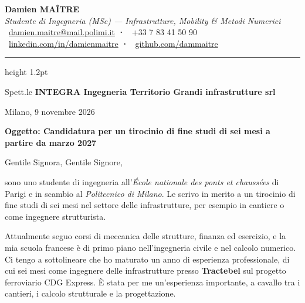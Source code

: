 \documentclass[a4paper,11pt]{extarticle}
\newcommand{\azienda}{INTEGRA Ingegneria Territorio Grandi infrastrutture srl}
\begin{document}
\begin{center}
  {\LARGE\bfseries\color{accent} Damien MAÎTRE}\\[2pt]
  {\normalsize\textit{\textcolor{muted}{Studente di Ingegneria (MSc) — Infrastrutture, Mobility \& Metodi Numerici}}}\\[4pt]
  \small
  \textcolor{muted}{
    \faEnvelope\ \href{mailto:damien.maitre@mail.polimi.it}{damien.maitre@mail.polimi.it}
    \quad\textbf{·}\quad
    \faPhone\ +33 7 83 41 50 90
    \\[1pt]
    \faLinkedin\ \href{https://linkedin.com/in/damienmaitre}{linkedin.com/in/damienmaitre}
    \quad\textbf{·}\quad
    \faGithub\ \href{https://github.com/dammaitre}{github.com/dammaitre}
  }
\end{center}

\vspace{2pt}
{\color{accent}\hrule height 1.2pt}
\vspace{10pt}

\begin{flushright}
  Spett.le \textbf{\azienda}\\
\end{flushright}

\vspace{4pt}
Milano, 9 novembre 2026

\vspace{4pt}
{\color{accent}\textbf{Oggetto: Candidatura per un tirocinio di fine studi di sei mesi a partire da marzo 2027}}

\vspace{4pt}
Gentile Signora, Gentile Signore,

sono uno studente di ingegneria all'\textit{École nationale des ponts et chaussées} di Parigi e in scambio al \textit{Politecnico di Milano}. Le scrivo in merito a un tirocinio di fine studi di sei mesi nel settore delle infrastrutture, per esempio in cantiere o come ingegnere strutturista.

Attualmente seguo corsi di meccanica delle strutture, finanza ed esercizio, e la mia scuola francese è di primo piano nell'ingegneria civile e nel calcolo numerico. Ci tengo a sottolineare che ho maturato un anno di esperienza professionale, di cui sei mesi come ingegnere delle infrastrutture presso \textbf{Tractebel} sul progetto ferroviario CDG Express. È stata per me un'esperienza importante, a cavallo tra i cantieri, i calcolo strutturale e la progettazione. 
\end{document}
